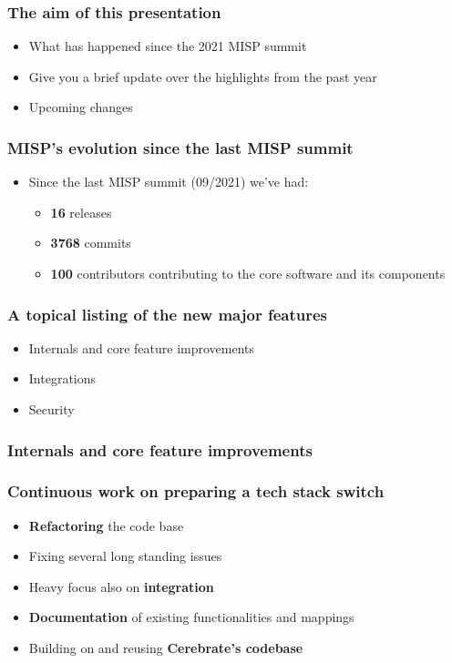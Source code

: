 
\begin{frame}
\titlepage
\end{frame}

\begin{frame}
  \frametitle{The aim of this presentation}
  \begin{itemize}
     \item What has happened since the 2021 MISP summit
     \item Give you a brief update over the highlights from the past year
     \item Upcoming changes
  \end{itemize}
\end{frame}

\begin{frame}
  \frametitle{MISP's evolution since the last MISP summit}
  \begin{itemize}
    \item Since the last MISP summit (09/2021) we've had:
    \begin{itemize}
        \item {\bf 16} releases
        \item {\bf 3768} commits
        \item {\bf 100} contributors contributing to the core software and its components
    \end{itemize}
  \end{itemize}
\end{frame}

\begin{frame}
  \frametitle{A topical listing of the new major features}
  \begin{itemize}
      \item Internals and core feature improvements
      \item Integrations
      \item Security
  \end{itemize}
\end{frame}

\begin{frame}
  \frametitle{Internals and core feature improvements}
\end{frame}

\begin{frame}
  \frametitle{Continuous work on preparing a tech stack switch}
  \begin{itemize}
      \item {\bf Refactoring} the code base
      \item Fixing several long standing issues
      \item Heavy focus also on {\bf integration}
      \item {\bf Documentation} of existing functionalities and mappings
      \item Building on and reusing {\bf Cerebrate's codebase}
  \end{itemize}
\end{frame}


